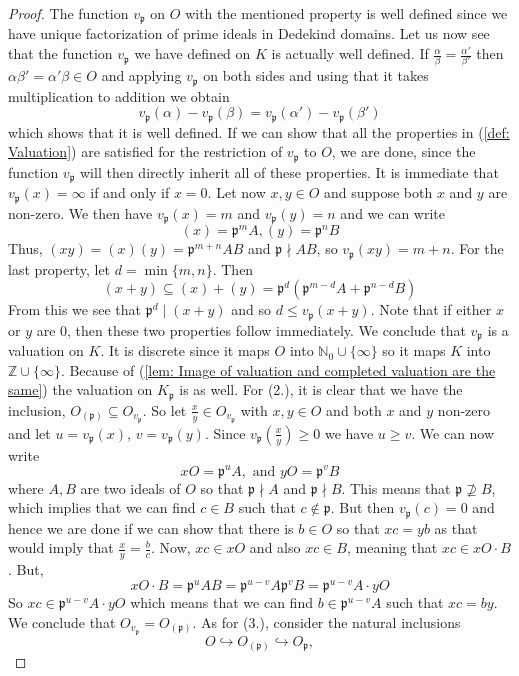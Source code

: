 \documentclass{article}
\newcommand{\mfrak}[1]{\mathfrak{#1}}
\newcommand{\mbb}[1]{\mathbb{#1}}
\newcommand{\vp}{{v_{\mfrak p}}}
\begin{document}
\begin{proof}
    The function $\vp$ on $O$ with the mentioned property is well defined since we have unique factorization of prime ideals in Dedekind domains. Let us now see that the function $\vp$ we have defined on $K$ is actually well defined. If $\frac{\alpha}{\beta} = \frac{\alpha'}{\beta'}$ then $\alpha\beta' = \alpha'\beta \in O$ and applying $\vp$ on both sides and using that it takes multiplication to addition we obtain
    $$\vp(\alpha) - \vp(\beta) = \vp(\alpha') - \vp(\beta')$$
    which shows that it is well defined. If we can show that all the properties in (\ref{def: Valuation}) are satisfied for the restriction of $\vp$ to $O$, we are done, since the function $\vp$ will then directly inherit all of these properties. It is immediate that $\vp(x) = \infty$ if and only if $x = 0$. Let now $x,y \in O$ and suppose both $x$ and $y$ are non-zero. We then have $\vp (x) = m$ and $\vp (y) = n$ and we can write
    $$(x) = \mfrak{p}^m A, (y) = \mfrak{p}^n B$$
    Thus, $(xy) = (x)(y) = \mfrak{p}^{m+n} AB$ and $\mfrak p \nmid AB$, so $\vp(xy) = m + n$. For the last property, let $d = \min\{m, n\}$. Then
    $$(x + y) \subseteq (x) + (y) = \mfrak p^d (\mfrak p^{m-d} A + \mfrak p^{n-d} B)$$
    From this we see that $\mfrak p^d \mid (x + y)$ and so $d \leq \vp (x+y)$. 
    Note that if either $x$ or $y$ are 0, then these two properties follow immediately. We conclude that $\vp$ is a valuation on $K$. It is discrete since it maps $O$ into $\mbb N_0 \cup \{\infty \}$ so it maps $K$ into $\mbb Z \cup \{\infty \}$. Because of (\ref{lem: Image of valuation and completed valuation are the same}) the valuation on $K_\mfrak p$ is as well. For (2.), it is clear that we have the inclusion, $O_{(\mfrak p)} \subseteq O_\vp$. So let $\frac{x}{y} \in O_\vp$ with $x,y \in O$ and both $x$ and $y$ non-zero and let $u = \vp(x)$, $v = \vp(y)$. Since $\vp(\frac{x}{y})  \geq 0$ we have $u \geq v$. We can now write 
    $$x O = \mfrak p^u A, \text{ and } y O = \mfrak p^v B$$
    where $A,B$ are two ideals of $O$ so that $\mfrak p \nmid A$ and $\mfrak p \nmid B$. This means that $\mfrak p \nsupseteq B$, which implies that we can find $c \in B$ such that $c \notin \mfrak p$. But then $\vp(c) = 0$ and hence we are done if we can show that there is $b \in O$ so that $xc = yb$ as that would imply that $\frac{x}{y} = \frac{b}{c}$. Now, $xc \in x O$ and also $xc \in B$, meaning that $xc \in x O \cdot B$. But,
    $$x O \cdot B = \mfrak p^u A B = \mfrak p^{u-v} A \mfrak p^v B = \mfrak p^{u-v} A \cdot y O$$   
    So $xc \in \mfrak p^{u-v} A \cdot y O$ which means that we can find $b \in \mfrak p^{u-v} A$ such that $xc = by$. We conclude that $O_\vp = O_{(\mfrak p)}$.  
    As for (3.), consider the natural inclusions 
    $$O \hookrightarrow O_{(\mfrak p)} \hookrightarrow O_\mfrak p,$$
    

\end{proof}
\end{document}

